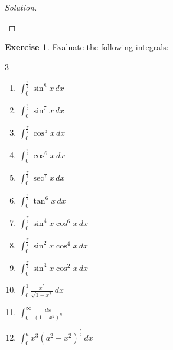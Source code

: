 \documentclass{book}
\theoremstyle{definition}
\newtheorem{exercise}{Exercise}[section]
\newenvironment{solution}
    {\begin{proof}[Solution]}
    {\end{proof}}
\begin{document}
\begin{solution}
\begin{enumerate}[label=(\roman*)]
\end{enumerate}   
\end{solution}

\begin{exercise}
 Evaluate the following integrals:
\begin{multicols}{3}
\begin{enumerate}[label=(\roman*)]
    \item $\displaystyle\int_0^{\frac{\pi}{2}}\sin^8x\,dx$
    \item $\displaystyle\int_0^{\frac{\pi}{2}}\sin^7x\,dx$
    \item $\displaystyle\int_0^{\frac{\pi}{2}}\cos^5x\,dx$
    \item $\displaystyle\int_0^{\frac{\pi}{2}}\cos^6x\,dx$
    \item $\displaystyle\int_0^{\frac{\pi}{4}}\sec^7x\,dx$
    \item $\displaystyle\int_0^{\frac{\pi}{4}}\tan^6x\,dx$
    \item $\displaystyle\int_0^{\frac{\pi}{2}}\sin^4x\cos^6x\,dx$
    \item $\displaystyle\int_0^{\frac{\pi}{2}}\sin^2x\cos^4x\,dx$
    \item $\displaystyle\int_0^{\frac{\pi}{2}}\sin^3x\cos^2x\,dx$
    \item $\displaystyle\int_0^1\frac{x^5}{\sqrt{1-x^2}}\,dx$
    \item $\displaystyle\int_0^\infty\frac{dx}{(1+x^2)^n}$
    \item $\displaystyle\int_0^ax^3(a^2-x^2)^{\frac{5}{2}}\,dx$

\end{enumerate}
\end{multicols}
\end{exercise}
\end{document}
